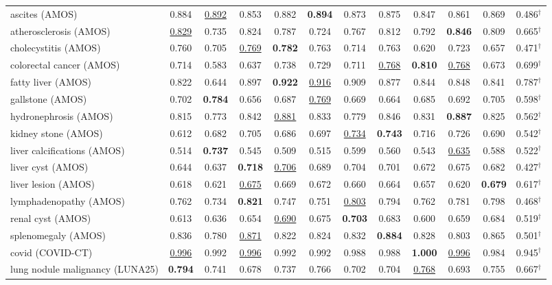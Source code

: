 \begin{minipage}{\textwidth}
{\begin{tabular}{@{}lccccccccccc@{}}
ascites (AMOS) & 0.884 & \underline{0.892} & 0.853 & 0.882 & \textbf{0.894} & 0.873 & 0.875 & 0.847 & 0.861 & 0.869 & 0.486$^{\dagger}$ \\
atherosclerosis (AMOS) & \underline{0.829} & 0.735 & 0.824 & 0.787 & 0.724 & 0.767 & 0.812 & 0.792 & \textbf{0.846} & 0.809 & 0.665$^{\dagger}$ \\
cholecystitis (AMOS) & 0.760 & 0.705 & \underline{0.769} & \textbf{0.782} & 0.763 & 0.714 & 0.763 & 0.620 & 0.723 & 0.657 & 0.471$^{\dagger}$ \\
colorectal cancer (AMOS) & 0.714 & 0.583 & 0.637 & 0.738 & 0.729 & 0.711 & \underline{0.768} & \textbf{0.810} & \underline{0.768} & 0.673 & 0.699$^{\dagger}$ \\
fatty liver (AMOS) & 0.822 & 0.644 & 0.897 & \textbf{0.922} & \underline{0.916} & 0.909 & 0.877 & 0.844 & 0.848 & 0.841 & 0.787$^{\dagger}$ \\
gallstone (AMOS) & 0.702 & \textbf{0.784} & 0.656 & 0.687 & \underline{0.769} & 0.669 & 0.664 & 0.685 & 0.692 & 0.705 & 0.598$^{\dagger}$ \\
hydronephrosis (AMOS) & 0.815 & 0.773 & 0.842 & \underline{0.881} & 0.833 & 0.779 & 0.846 & 0.831 & \textbf{0.887} & 0.825 & 0.562$^{\dagger}$ \\
kidney stone (AMOS) & 0.612 & 0.682 & 0.705 & 0.686 & 0.697 & \underline{0.734} & \textbf{0.743} & 0.716 & 0.726 & 0.690 & 0.542$^{\dagger}$ \\
liver calcifications (AMOS) & 0.514 & \textbf{0.737} & 0.545 & 0.509 & 0.515 & 0.599 & 0.560 & 0.543 & \underline{0.635} & 0.588 & 0.522$^{\dagger}$ \\
liver cyst (AMOS) & 0.644 & 0.637 & \textbf{0.718} & \underline{0.706} & 0.689 & 0.704 & 0.701 & 0.672 & 0.675 & 0.682 & 0.427$^{\dagger}$ \\
liver lesion (AMOS) & 0.618 & 0.621 & \underline{0.675} & 0.669 & 0.672 & 0.660 & 0.664 & 0.657 & 0.620 & \textbf{0.679} & 0.617$^{\dagger}$ \\
lymphadenopathy (AMOS) & 0.762 & 0.734 & \textbf{0.821} & 0.747 & 0.751 & \underline{0.803} & 0.794 & 0.762 & 0.781 & 0.798 & 0.468$^{\dagger}$ \\
renal cyst (AMOS) & 0.613 & 0.636 & 0.654 & \underline{0.690} & 0.675 & \textbf{0.703} & 0.683 & 0.600 & 0.659 & 0.684 & 0.519$^{\dagger}$ \\
splenomegaly (AMOS) & 0.836 & 0.780 & \underline{0.871} & 0.822 & 0.824 & 0.832 & \textbf{0.884} & 0.828 & 0.803 & 0.865 & 0.501$^{\dagger}$ \\
covid (COVID-CT) & \underline{0.996} & 0.992 & \underline{0.996} & 0.992 & 0.992 & 0.988 & 0.988 & \textbf{1.000} & \underline{0.996} & 0.984 & 0.945$^{\dagger}$ \\
lung nodule malignancy (LUNA25) & \textbf{0.794} & 0.741 & 0.678 & 0.737 & 0.766 & 0.702 & 0.704 & \underline{0.768} & 0.693 & 0.755 & 0.667$^{\dagger}$ \\
\bottomrule
\end{tabular}
}\end{minipage}
